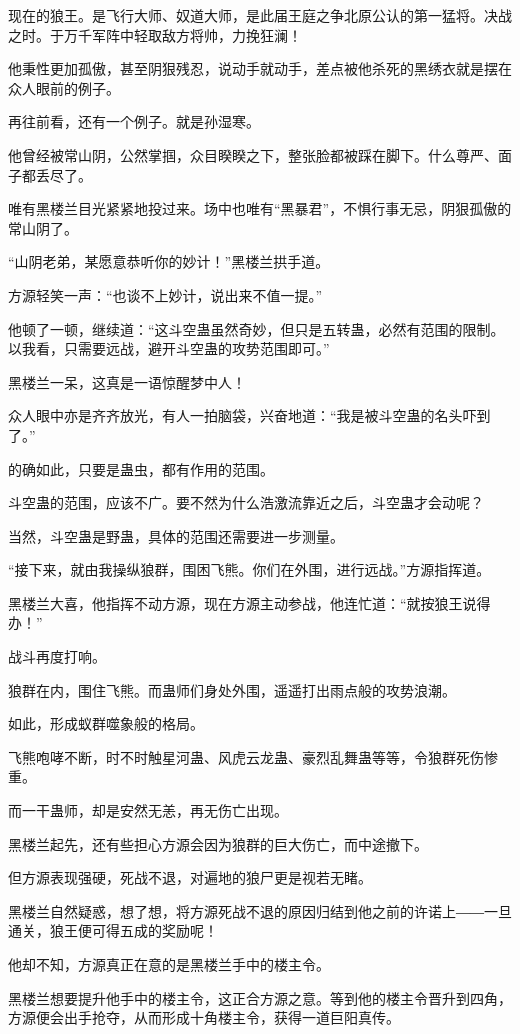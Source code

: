 \begin{this_body}
现在的狼王。是飞行大师、奴道大师，是此届王庭之争北原公认的第一猛将。决战之时。于万千军阵中轻取敌方将帅，力挽狂澜！

他秉性更加孤傲，甚至阴狠残忍，说动手就动手，差点被他杀死的黑绣衣就是摆在众人眼前的例子。

再往前看，还有一个例子。就是孙湿寒。

他曾经被常山阴，公然掌掴，众目睽睽之下，整张脸都被踩在脚下。什么尊严、面子都丢尽了。

唯有黑楼兰目光紧紧地投过来。场中也唯有“黑暴君”，不惧行事无忌，阴狠孤傲的常山阴了。

“山阴老弟，某愿意恭听你的妙计！”黑楼兰拱手道。

方源轻笑一声：“也谈不上妙计，说出来不值一提。”

他顿了一顿，继续道：“这斗空蛊虽然奇妙，但只是五转蛊，必然有范围的限制。以我看，只需要远战，避开斗空蛊的攻势范围即可。”

黑楼兰一呆，这真是一语惊醒梦中人！

众人眼中亦是齐齐放光，有人一拍脑袋，兴奋地道：“我是被斗空蛊的名头吓到了。”

的确如此，只要是蛊虫，都有作用的范围。

斗空蛊的范围，应该不广。要不然为什么浩激流靠近之后，斗空蛊才会动呢？

当然，斗空蛊是野蛊，具体的范围还需要进一步测量。

“接下来，就由我操纵狼群，围困飞熊。你们在外围，进行远战。”方源指挥道。

黑楼兰大喜，他指挥不动方源，现在方源主动参战，他连忙道：“就按狼王说得办！”

战斗再度打响。

狼群在内，围住飞熊。而蛊师们身处外围，遥遥打出雨点般的攻势浪潮。

如此，形成蚁群噬象般的格局。

飞熊咆哮不断，时不时触星河蛊、风虎云龙蛊、豪烈乱舞蛊等等，令狼群死伤惨重。

而一干蛊师，却是安然无恙，再无伤亡出现。

黑楼兰起先，还有些担心方源会因为狼群的巨大伤亡，而中途撤下。

但方源表现强硬，死战不退，对遍地的狼尸更是视若无睹。

黑楼兰自然疑惑，想了想，将方源死战不退的原因归结到他之前的许诺上――一旦通关，狼王便可得五成的奖励呢！

他却不知，方源真正在意的是黑楼兰手中的楼主令。

黑楼兰想要提升他手中的楼主令，这正合方源之意。等到他的楼主令晋升到四角，方源便会出手抢夺，从而形成十角楼主令，获得一道巨阳真传。


\end{this_body}
